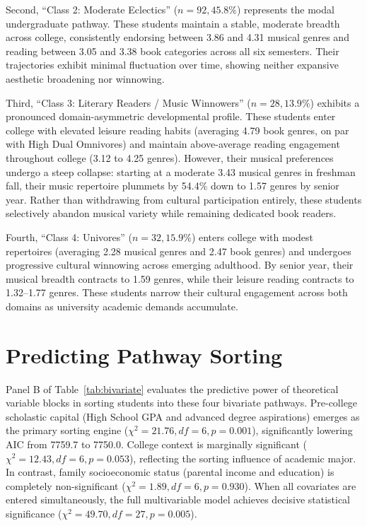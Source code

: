 \documentclass[12pt]{article}
\begin{document}
Second, ``Class 2: Moderate Eclectics'' ($n = 92, 45.8\%$) represents the modal undergraduate pathway. These students maintain a stable, moderate breadth across college, consistently endorsing between 3.86 and 4.31 musical genres and reading between 3.05 and 3.38 book categories across all six semesters. Their trajectories exhibit minimal fluctuation over time, showing neither expansive aesthetic broadening nor winnowing.

Third, ``Class 3: Literary Readers / Music Winnowers'' ($n = 28, 13.9\%$) exhibits a pronounced domain-asymmetric developmental profile. These students enter college with elevated leisure reading habits (averaging 4.79 book genres, on par with High Dual Omnivores) and maintain above-average reading engagement throughout college (3.12 to 4.25 genres). However, their musical preferences undergo a steep collapse: starting at a moderate 3.43 musical genres in freshman fall, their music repertoire plummets by 54.4\% down to 1.57 genres by senior year. Rather than withdrawing from cultural participation entirely, these students selectively abandon musical variety while remaining dedicated book readers.

Fourth, ``Class 4: Univores'' ($n = 32, 15.9\%$) enters college with modest repertoires (averaging 2.28 musical genres and 2.47 book genres) and undergoes progressive cultural winnowing across emerging adulthood. By senior year, their musical breadth contracts to 1.59 genres, while their leisure reading contracts to 1.32--1.77 genres. These students narrow their cultural engagement across both domains as university academic demands accumulate.

\section{Predicting Pathway Sorting}

Panel B of Table~\ref{tab:bivariate} evaluates the predictive power of theoretical variable blocks in sorting students into these four bivariate pathways. Pre-college scholastic capital (High School GPA and advanced degree aspirations) emerges as the primary sorting engine ($\chi^2 = 21.76, df = 6, p = 0.001$), significantly lowering AIC from 7759.7 to 7750.0. College context is marginally significant ($\chi^2 = 12.43, df = 6, p = 0.053$), reflecting the sorting influence of academic major. In contrast, family socioeconomic status (parental income and education) is completely non-significant ($\chi^2 = 1.89, df = 6, p = 0.930$). When all covariates are entered simultaneously, the full multivariable model achieves decisive statistical significance ($\chi^2 = 49.70, df = 27, p = 0.005$).
\end{document}
